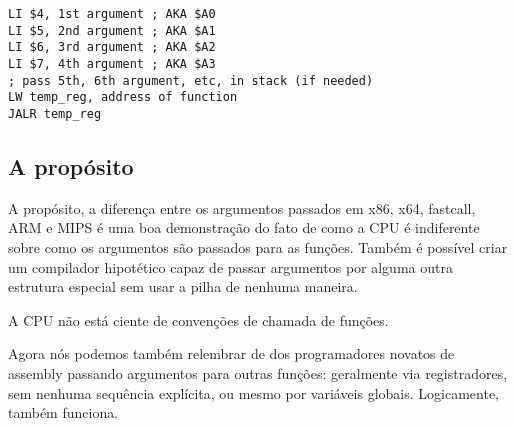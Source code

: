 \begin{lstlisting}[caption=MIPS (O32 calling convention)]
LI $4, 1st argument ; AKA $A0
LI $5, 2nd argument ; AKA $A1
LI $6, 3rd argument ; AKA $A2
LI $7, 4th argument ; AKA $A3
; pass 5th, 6th argument, etc, in stack (if needed)
LW temp_reg, address of function
JALR temp_reg
\end{lstlisting}

\subsection{A propósito}

A propósito, a diferença entre os argumentos passados em x86, x64, fastcall, ARM e MIPS  é uma boa demonstração do fato de como a CPU é indiferente sobre como os argumentos são passados para as funções.
Também é possível criar um compilador hipotético capaz de passar argumentos por alguma outra estrutura especial sem usar a pilha de nenhuma maneira.

\PTBRph{}

A \ac{CPU} não está ciente de convenções de chamada de funções.

Agora nós podemos também relembrar de dos programadores novatos de assembly passando argumentos para outras funções:
geralmente via registradores, sem nenhuma sequência explícita, ou mesmo por variáveis globais. Logicamente, também funciona.

